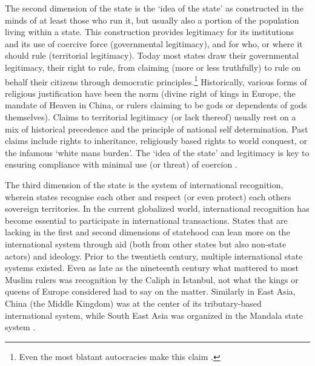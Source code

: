 The second dimension of the state is the `idea of the state' as constructed in the
minds of at least those who run it, but usually also a portion of the population
living within a state. This construction provides legitimacy for its
institutions and its use of coercive force (governmental legitimacy), and for
who, or where it should rule (territorial legitimacy). Today most states draw
their governmental legitimacy, their right to rule, from claiming (more or less
truthfully) to rule on behalf their citizens through democratic
principles.\footnote{Even the most blatant autocracies make this claim
\citep{FukuyamaFrancis2014POaP}.} Historically, various forms of religious
justification have been the norm (divine right of kings in Europe, the mandate
of Heaven in China, or rulers claiming to be gods or dependents of gods
themselves). Claims to territorial legitimacy (or lack thereof) usually rest on
a mix of historical precedence and the principle of national self determination.
Past claims include rights to inheritance, religiously based rights to world
conquest, or the infamous `white mans burden'. The `idea of the state' and
legitimacy is key to ensuring compliance with minimal use (or threat) of
coercion \citep{BuzanBarry2007PSaF}. 

The third dimension of the state is the system of international recognition,
wherein states recognise each other and respect (or even protect) each others
sovereign territories. In the current globalized world, international
recognition has become essential to participate in international transactions.
States that are lacking in the first and second dimensions of statehood can lean
more on the international system through aid (both from other states but also
non-state actors) and ideology. Prior to the twentieth century, multiple
international state systems existed. Even as late as the nineteenth century what
mattered to most Muslim rulers was recognition by the Caliph in Istanbul, not
what the kings or queens of Europe considered had to say on the matter.
Similarly in East Asia, China (the Middle Kingdom) was at the center of its
tributary-based international system, while South East Asia was organized in the
Mandala state system \citep{Hui_2005, KangDavidC2010EAbt}.

